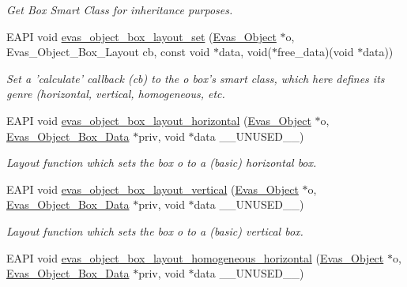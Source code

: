 \begin{DoxyCompactItemize}
\begin{DoxyCompactList}\small\item\em Get Box Smart Class for inheritance purposes. \item\end{DoxyCompactList}\item 
EAPI void \hyperlink{group__Evas__Object__Box_ga2116d23c11ab08d7c50cbcb588de5570}{evas\_\-object\_\-box\_\-layout\_\-set} (\hyperlink{group__Evas__Object__Group_ga9e19e6dd1f517a0ba437c0114d3e7c97}{Evas\_\-Object} $\ast$o, Evas\_\-Object\_\-Box\_\-Layout cb, const void $\ast$data, void($\ast$free\_\-data)(void $\ast$data))
\begin{DoxyCompactList}\small\item\em Set a 'calculate' callback ({\itshape cb\/}) to the {\itshape o\/} box's smart class, which here defines its genre (horizontal, vertical, homogeneous, etc. \item\end{DoxyCompactList}\item 
EAPI void \hyperlink{group__Evas__Object__Box_gaabb841838ce9c05f6b99350d15b76aaf}{evas\_\-object\_\-box\_\-layout\_\-horizontal} (\hyperlink{group__Evas__Object__Group_ga9e19e6dd1f517a0ba437c0114d3e7c97}{Evas\_\-Object} $\ast$o, \hyperlink{struct__Evas__Object__Box__Data}{Evas\_\-Object\_\-Box\_\-Data} $\ast$priv, void $\ast$data \_\-\_\-UNUSED\_\-\_\-)
\begin{DoxyCompactList}\small\item\em Layout function which sets the box {\itshape o\/} to a (basic) horizontal box. \item\end{DoxyCompactList}\item 
EAPI void \hyperlink{group__Evas__Object__Box_ga1e102aa54789b74f54944c17d0a880db}{evas\_\-object\_\-box\_\-layout\_\-vertical} (\hyperlink{group__Evas__Object__Group_ga9e19e6dd1f517a0ba437c0114d3e7c97}{Evas\_\-Object} $\ast$o, \hyperlink{struct__Evas__Object__Box__Data}{Evas\_\-Object\_\-Box\_\-Data} $\ast$priv, void $\ast$data \_\-\_\-UNUSED\_\-\_\-)
\begin{DoxyCompactList}\small\item\em Layout function which sets the box {\itshape o\/} to a (basic) vertical box. \item\end{DoxyCompactList}\item 
EAPI void \hyperlink{group__Evas__Object__Box_gac4478016783bad6d2170571a11a23e21}{evas\_\-object\_\-box\_\-layout\_\-homogeneous\_\-horizontal} (\hyperlink{group__Evas__Object__Group_ga9e19e6dd1f517a0ba437c0114d3e7c97}{Evas\_\-Object} $\ast$o, \hyperlink{struct__Evas__Object__Box__Data}{Evas\_\-Object\_\-Box\_\-Data} $\ast$priv, void $\ast$data \_\-\_\-UNUSED\_\-\_\-)

\end{DoxyCompactItemize}
